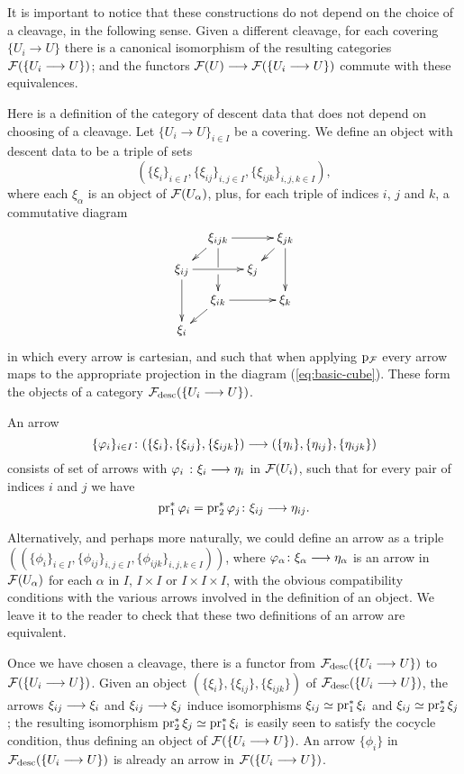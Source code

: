 \begin{4   STACKS}
\begin{4.1 Descent of objects of fibcats}
It is important to notice that these constructions do not depend on the choice of a cleavage, in the following sense. Given a different cleavage,  for each covering $\{U_i \to U\}$ there is a canonical isomorphism of the resulting categories $\mathcal{F}(\{U_i \longrightarrow U\})$; and the functors $\cF(U) \arr \cF(\{U_i \to U\})$ commute with these equivalences.



Here is a definition of the category of descent data that does not depend on choosing of a cleavage. Let $\{U_i \to U\}_{i \in I}$ be a covering. We define an object with descent data to be a triple of sets
   \[
   (\{\xi_i\}_{i \in I}, \{\xi_{ij}\}_{i, j\in I},
   \{\xi_{ijk}\}_{i, j, k\in I}),
   \]
where each $\xi_\alpha$ is an object of $\mathcal{F}(U_{\alpha})$, plus, for each triple of indices $i$, $j$ and $k$, a commutative diagram
   \[
   \xymatrix@-15pt{
   &\xi_{ijk}\ar[rr]\ar'[d][dd] \ar[ld] &&\xi_{jk}\ar[ld]\ar[dd]\\
   \xi_{ij}\ar[dd]\ar[rr] && \xi_j\\
   &\xi_{ik} \ar[ld]\ar[rr] &&\xi_k\\
   \xi_i&&
   }
   \]
in which every arrow is cartesian, and such that when applying $\mathrm{p}_{\mathcal{F}}$ every arrow maps to the appropriate projection in the diagram (\ref{eq:basic-cube}). These form the objects of a category $\mathcal{F}_{\mathrm{desc}}(\{U_i \longrightarrow U\})$.

An arrow
   \[
   \{\phi_i\}_{i \in I} \colon (\{\xi_i\}, \{\xi_{ij}\},\{\xi_{ijk}\})
   \arr (\{\eta_i\}, \{\eta_{ij}\}, \{\eta_{ijk}\})
   \]
consists of set of arrows with $\phi_i\ \colon \xi_i \arr \eta_i $ in $\mathcal{F}(U_i)$, such that for every pair of indices $i$ and $j$ we have
   \[
   \pr_1^* \phi_i = \pr_2 ^* \phi_j \colon 
   \xi_{ij} \arr \eta_{ij}.
   \]

Alternatively, and perhaps more naturally, we could define an arrow as a triple $((\{\phi_i\}_{i \in I}, \{\phi_{ij}\}_{i, j\in I}, \{\phi_{ijk}\}_{i, j, k\in I}))$, where $\phi_\alpha \colon \xi_\alpha \arr \eta_\alpha$ is an arrow in $\mathcal{F}(U_{\alpha})$ for each $\alpha$ in $I$, $I\times I$ or $I \times I \times I$, with the obvious compatibility conditions with the various arrows involved in the definition of an object. We leave it to the reader to check that these two definitions of an arrow are equivalent.

Once we have chosen a cleavage, there is a functor from $\mathcal{F}_{\mathrm{desc}} (\{U_i \longrightarrow U\})$ to $\mathcal{F}(\{U_i \longrightarrow U\})$. Given an object $(\{\xi_i\}, \{\xi_{ij}\}, \{\xi_{ijk}\})$ of $\mathcal{F}_{\mathrm{desc}}(\{U_i \longrightarrow U\})$, the arrows $\xi_{ij} \arr \xi_i$ and $\xi_{ij} \arr\xi_j$ induce isomorphisms $\xi_{ij} \simeq \operatorname{pr}_1^* \xi_i$ and $\xi_{ij} \simeq \operatorname{pr}_2^* \xi_j$; the resulting isomorphism $\operatorname{pr}_2^* \xi_j \simeq \operatorname{pr}_1^* \xi_i$ is easily seen to satisfy the cocycle condition, thus defining an object of $\mathcal{F}(\{U_i \longrightarrow U\})$. An arrow $\{\phi_i\}$ in $\mathcal{F}_{\mathrm{desc}} (\{U_i \longrightarrow U\})$ is already an arrow in $\mathcal{F}(\{U_i \longrightarrow U\})$.


\end{4.1 Descent of objects of fibcats}
\end{4   STACKS}
